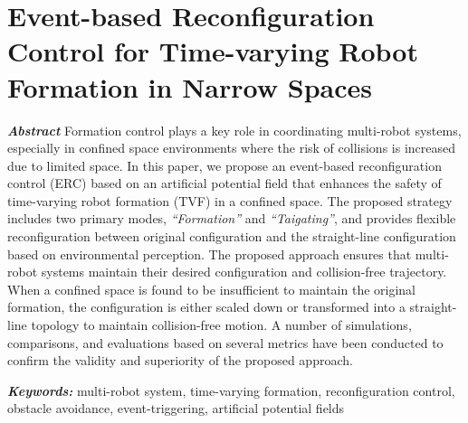 \chapter{Event-based Reconfiguration Control for Time-varying Robot Formation in Narrow Spaces}\label{paper2}

\vspace{1cm}

\noindent\textit{\textbf{Abstract}}
Formation control plays a key role in coordinating multi-robot systems, especially in confined space environments where the risk of collisions is increased due to limited space. In this paper, we propose an event-based reconfiguration control (ERC) based on an artificial potential field that enhances the safety of time-varying robot formation (TVF) in a confined space. The proposed strategy includes two primary modes, \textit{``Formation''} and \textit{``Taigating''}, and provides flexible reconfiguration between original configuration and the straight-line configuration based on environmental perception. The proposed approach ensures that multi-robot systems maintain their desired configuration and collision-free trajectory. When a confined space is found to be insufficient to maintain the original formation, the configuration is either scaled down or transformed into a straight-line topology to maintain collision-free motion. A number of simulations, comparisons, and evaluations based on several metrics have been conducted to confirm the validity and superiority of the proposed approach.

\noindent\textbf{\textit{Keywords:}}
multi-robot system, time-varying formation, reconfiguration control, obstacle avoidance, event-triggering, artificial potential fields







